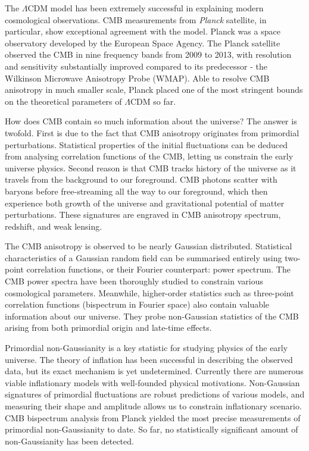 The $\Lambda$CDM model has been extremely successful in explaining modern cosmological observations. CMB measurements from \textit{Planck} satellite, in particular, show exceptional agreement with the model. Planck was a space observatory developed by the European Space Agency. The Planck satellite observed the CMB in nine frequency bands from 2009 to 2013, with resolution and sensitivity substantially improved compared to its predecessor - the Wilkinson Microwave Anisotropy Probe (WMAP). Able to resolve CMB anisotropy in much smaller scale, Planck placed one of the most stringent bounds on the theoretical parameters of $\Lambda$CDM so far.

How does CMB contain so much information about the universe? The answer is twofold. First is due to the fact that CMB anisotropy originates from primordial perturbations. Statistical properties of the initial fluctuations can be deduced from analysing correlation functions of the CMB, letting us constrain the early universe physics. Second reason is that CMB tracks history of the universe as it travels from the background to our foreground. CMB photons scatter with baryons before free-streaming all the way to our foreground, which then experience both growth of the universe and gravitational potential of matter perturbations. These signatures are engraved in CMB anisotropy spectrum, redshift, and weak lensing.

The CMB anisotropy is observed to be nearly Gaussian distributed. Statistical characteristics of a Gaussian random field can be summarised entirely using two-point correlation functions, or their Fourier counterpart: power spectrum. The CMB power spectra have been thoroughly studied to constrain various cosmological parameters. Meanwhile, higher-order statistics such as three-point correlation functions (bispectrum in Fourier space) also contain valuable information about our universe. They probe non-Gaussian statistics of the CMB arising from both primordial origin and late-time effects.

Primordial non-Gaussianity is a key statistic for studying physics of the early universe. The theory of inflation has been successful in describing the observed data, but its exact mechanism is yet undetermined. Currently there are numerous viable inflationary models with well-founded physical motivations. Non-Gaussian signatures of primordial fluctuations are robust predictions of various models, and measuring their shape and amplitude allows us to constrain inflationary scenario. CMB bispectrum analysis from Planck yielded the most precise measurements of primordial non-Gaussianity to date. So far, no statistically significant amount of non-Gaussianity has been detected.

